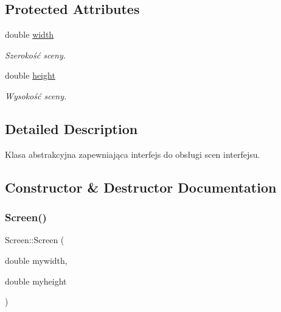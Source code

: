 \subsection*{Protected Attributes}
\begin{DoxyCompactItemize}
\item 
\mbox{\label{class_screen_aa3f00a200859204999068aa8a1fbc2e1}} 
double \mbox{\hyperlink{class_screen_aa3f00a200859204999068aa8a1fbc2e1}{width}}
\begin{DoxyCompactList}\small\item\em Szerokość sceny. \end{DoxyCompactList}\item 
\mbox{\label{class_screen_a608a5e1be378a6a05d341296707d2f8f}} 
double \mbox{\hyperlink{class_screen_a608a5e1be378a6a05d341296707d2f8f}{height}}
\begin{DoxyCompactList}\small\item\em Wysokość sceny. \end{DoxyCompactList}\end{DoxyCompactItemize}


\subsection{Detailed Description}
Klasa abstrakcyjna zapewniająca interfejs do obsługi scen interfejsu. 

\subsection{Constructor \& Destructor Documentation}
\mbox{\label{class_screen_a1da1a362bfe70dad75bfc610af0fd001}} 
\subsubsection{\texorpdfstring{Screen()}{Screen()}}
{\footnotesize\ttfamily Screen\+::\+Screen (\begin{DoxyParamCaption}\item[{double}]{mywidth,  }\item[{double}]{myheight }\end{DoxyParamCaption})\hspace{0.3cm}{\ttfamily [inline]}}



